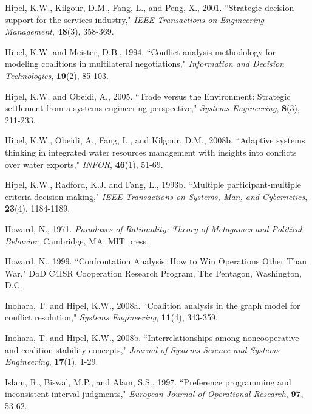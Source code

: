\documentclass[letterpaper,12pt,titlepage,oneside,final]{book}
\begin{document}
\begin{thebibliography}{}
Hipel, K.W., Kilgour, D.M., Fang, L., and Peng, X., 2001. ``Strategic decision support for the services industry," \emph{IEEE Transactions on Engineering Management}, {\bf 48}(3), 358-369.

Hipel, K.W. and Meister, D.B., 1994. ``Conflict analysis methodology for modeling coalitions in multilateral negotiations," \emph{Information and Decision Technologies}, {\bf 19}(2), 85-103.

Hipel, K.W. and Obeidi, A., 2005. ``Trade versus the Environment: Strategic settlement from a systems engineering perspective," \emph{Systems Engineering}, {\bf 8}(3), 211-233.

Hipel, K.W., Obeidi, A., Fang, L., and Kilgour, D.M., 2008b. ``Adaptive systems thinking in integrated water resources management with insights into conflicts over water exports," \emph{INFOR}, {\bf 46}(1), 51-69.

Hipel, K.W., Radford, K.J. and Fang, L., 1993b. ``Multiple participant-multiple criteria decision making," \emph{IEEE Transactions on Systems, Man, and Cybernetics}, {\bf 23}(4), 1184-1189.

Howard, N., 1971. \emph{Paradoxes of Rationality: Theory of Metagames and Political Behavior}. Cambridge, MA: MIT press.

Howard, N., 1999. ``Confrontation Analysis: How to Win Operations Other Than War," DoD C4ISR Cooperation Research Program, The Pentagon, Washington, D.C.

Inohara, T. and Hipel, K.W., 2008a. ``Coalition analysis in the graph model for conflict resolution," \emph{Systems Engineering}, {\bf 11}(4), 343-359.

Inohara, T. and Hipel, K.W., 2008b. ``Interrelationships among noncooperative and coalition stability concepts," \emph{Journal of Systems Science and Systems Engineering}, {\bf 17}(1), 1-29.

Islam, R., Biswal, M.P., and Alam, S.S., 1997. ``Preference programming and inconsistent interval judgments," \emph{European Journal of Operational Research}, {\bf 97}, 53-62.


\end{thebibliography}
\end{document}
